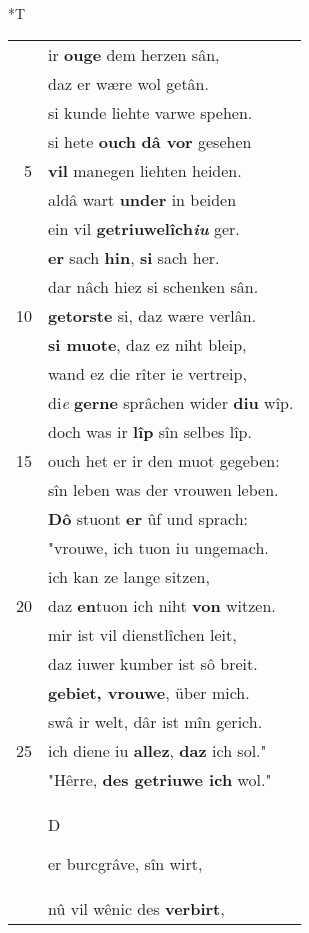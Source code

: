 \documentclass[8pt,a4paper,notitlepage]{article}
\begin{document}
\begin{table}[ht]
\begin{minipage}[t]{0.5\linewidth}
\small
\begin{center}*T
\end{center}
\begin{tabular}{rl}
 & ir \textbf{ouge} dem herzen sân,\\ 
 & daz er wære wol getân.\\ 
 & si kunde liehte varwe spehen.\\ 
 & si hete \textbf{ouch} \textbf{dâ vor} gesehen\\ 
5 & \textbf{vil} manegen liehten heiden.\\ 
 & aldâ wart \textbf{under} in beiden\\ 
 & ein vil \textbf{getriuwelîch\textit{iu}} ger.\\ 
 & \textbf{er} sach \textbf{hin}, \textbf{si} sach her.\\ 
 & dar nâch hiez si schenken sân.\\ 
10 & \textbf{getorste} si, daz wære verlân.\\ 
 & \textbf{si muote}, daz ez niht bleip,\\ 
 & wand ez die rîter ie vertreip,\\ 
 & di\textit{e} \textbf{gerne} sprâchen wider \textbf{diu} wîp.\\ 
 & doch was ir \textbf{lîp} sîn selbes lîp.\\ 
15 & ouch het er ir den muot gegeben:\\ 
 & sîn leben was der vrouwen leben.\\ 
 & \textbf{Dô} stuont \textbf{er} ûf und sprach:\\ 
 & "vrouwe, ich tuon iu ungemach.\\ 
 & ich kan ze lange sitzen,\\ 
20 & daz \textbf{en}tuon ich niht \textbf{von} witzen.\\ 
 & mir ist vil dienstlîchen leit,\\ 
 & daz iuwer kumber ist sô breit.\\ 
 & \textbf{gebiet, vrouwe}, über mich.\\ 
 & swâ ir welt, dâr ist mîn gerich.\\ 
25 & ich diene iu \textbf{allez}, \textbf{daz} ich sol."\\ 
 & "Hêrre, \textbf{des getriuwe ich} wol."\\ 
 & \begin{large}D\end{large}er burcgrâve, sîn wirt,\\ 
 & nû vil wênic des \textbf{verbirt},\\ 

\end{tabular}
\end{minipage}
\end{table}
\end{document}
